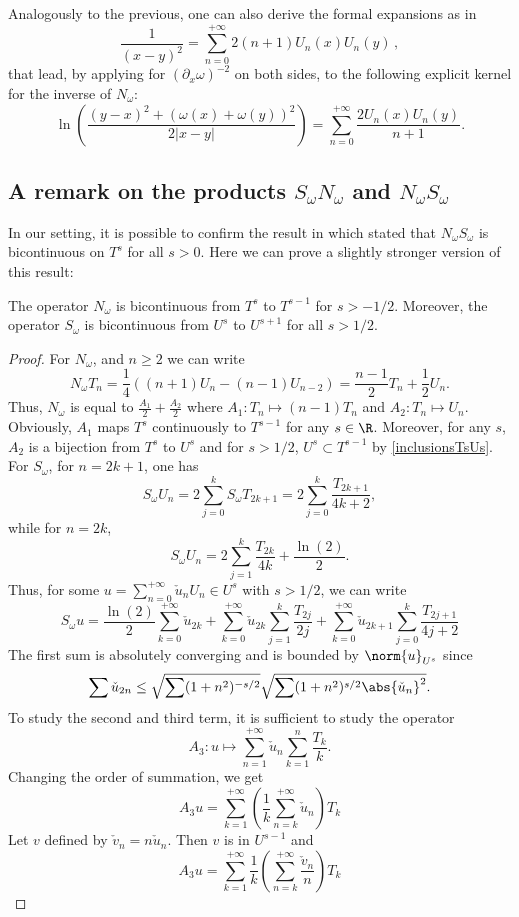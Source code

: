 \documentclass[a4paper]{article}
\begin{document}
	Analogously to the previous, one can also derive the formal expansions as in \cite{jerez2012explicit}
	\[\frac{1}{(x-y)^2} = \sum_{n=0}^{+\infty} 2(n+1)U_n(x)U_n(y)\,,\]
	that lead, by applying for $(\partial_x\omega)^{-2}$ on both sides, to the following explicit kernel for the inverse of $N_\omega$:
	\[\ln\left(\dfrac{(y-x)^2 + (\omega(x) + \omega(y))^2}{2|x-y|}\right) = \sum_{n=0}^{+\infty} \dfrac{2 U_n(x) U_n(y)}{n+1}.\]

\subsection{A remark on the products $S_\omega N_\omega$ and $N_\omega S_\omega$}

In our setting, it is possible to confirm the result in \cite{bruno2012second} which stated that $N_\omega S_\omega$ is bicontinuous on $T^s$ for all $s>0$. Here we can prove a slightly stronger version of this result:

\begin{The}
	The operator $N_\omega$ is bicontinuous from $T^{s}$ to $T^{s-1}$ for $s > -1/2$. Moreover, the operator $S_\omega$ is bicontinuous from $U^s$ to $U^{s+1}$ for all $s>1/2$.
\end{The}
\begin{proof}
	For $N_\omega$, and $n \geq 2$ we can write 
	\[N_\omega T_n = \frac{1}{4}\left( (n+1)U_n - (n-1) U_{n-2}\right) = \frac{n-1}{2} T_n  + \frac{1}{2} U_n.\]
	Thus, $N_\omega$ is equal to $\frac{A_1}{2} + \frac{A_2}{2}$ where $A_1 : T_n \mapsto (n-1)T_n$ and $A_2 : T_n \mapsto U_n$. Obviously, $A_1$ maps $T^s$ continuously to $T^{s-1}$ for any $s \in \R$. Moreover, for any $s$, $A_2$ is a bijection from $T^s$ to $U^s$ and for $s> 1/2$, $U^s \subset T^{s-1}$ by \autoref{inclusionsTsUs}. For $S_\omega$, for $n = 2k + 1$, one has
	\[S_\omega U_n = 2\sum_{j = 0}^k S_\omega T_{2k + 1} = 2 \sum_{j= 0}^k \frac{T_{2k+1}}{4k+ 2},\]
	while for $n = 2k$,
	\[S_\omega U_n = 2\sum_{j = 1}^k \frac{T_{2k}}{4k} + \frac{\ln(2)}{2}.\]
	Thus, for some $u = \sum_{n = 0}^{+ \infty} \check{u}_n U_n \in U^s$ with $s > 1/2$, we can write 
	\[S_\omega u = \frac{\ln(2)}{2} \sum_{k = 0}^{+ \infty} \check{u}_{2k} + \sum_{k = 0}^{+ \infty} \check{u}_{2k} \sum_{j = 1}^{k} \frac{T_{2j}}{2j} + \sum_{k = 0}^{+ \infty} \check{u}_{2k+1} \sum_{j = 0}^k \frac{T_{2j + 1}}{4j + 2}\]
	The first sum is absolutely converging and is bounded by $\norm{u}_{U^s}$ since
	\[ \sum {\check{u}_{2n}} \leq \sqrt{\sum (1 + n^2)^{-s/2}}\sqrt{\sum (1 + n^2)^{s/2} \abs{\check{u}_{n}}^2}. \]
	To study the second and third term, it is sufficient to study the operator 
	\[ A_3: u \mapsto \sum_{n= 1}^{+ \infty} \check{u}_n \sum_{k = 1}^{n} \frac{T_k}{k}.\]
	Changing the order of summation, we get
	\[A_3 u = \sum_{k = 1}^{+\infty} \left(\frac{1}{k} \sum_{n = k}^{+ \infty} \check{u}_n\right) T_k\]
	Let $v$ defined by $\check{v}_n = n \check{u}_n$. Then $v$ is in $U^{s-1}$ and 
	\[A_3 u = \sum_{k = 1}^{+ \infty}\frac{1}{k}\left( \sum_{n = k}^{+ \infty} \frac{\check{v}_n}{n}\right) T_k\]
	
\end{proof}
\end{document}
